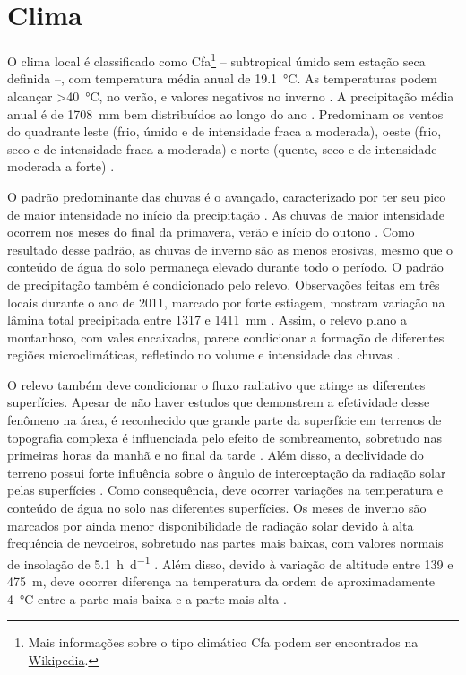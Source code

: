 \section{Clima}
\label{sec:chap02-clima}

\def\footcfa{\footnote{Mais informações sobre o tipo climático Cfa podem ser encontrados na 
\href{https://pt.wikipedia.org/wiki/Clima_subtropical_\%C3\%BAmido}{Wikipedia}.}}

O clima local é classificado como Cfa\footcfa{} -- subtropical úmido sem estação seca definida --, com 
temperatura média anual de \SI{19,1}{\celsius}. As temperaturas podem alcançar \SI{>40}{\celsius}, no verão, e 
valores negativos no inverno \cite{HeldweinEtAl2009}. A precipitação média anual é de \SI{1708}{\milli\metre} 
bem distribuídos ao longo do ano \cite{Maluf2000}. Predominam os ventos do quadrante leste (frio, úmido e de 
intensidade fraca a moderada), oeste (frio, seco e de intensidade fraca a moderada) e norte (quente, seco e de 
intensidade moderada a forte) \cite{HeldweinEtAl2009}.

O padrão predominante das chuvas é o avançado, caracterizado por ter seu pico de maior intensidade no início da 
precipitação \cite{MehlEtAl2001}. As chuvas de maior intensidade ocorrem nos meses do final da primavera, 
verão e início do outono \cite{MouraBueno2012}. Como resultado desse padrão, as chuvas de inverno são as 
menos erosivas, mesmo que o conteúdo de água do solo permaneça elevado durante todo o período. O padrão de 
precipitação também é condicionado pelo relevo. Observações feitas em três locais durante o ano de \num{2011}, 
marcado por forte estiagem, mostram variação na lâmina total precipitada entre \num{1317} e \SI{1411}{\mm} 
\cite{MouraBueno2012}. Assim, o relevo plano a montanhoso, com vales encaixados, parece condicionar a formação 
de diferentes regiões microclimáticas, refletindo no volume e intensidade das chuvas \cite{MouraBueno2012}.

O relevo também deve condicionar o fluxo radiativo que atinge as diferentes superfícies. Apesar de não haver 
estudos que demonstrem a efetividade desse fenômeno na área, é reconhecido que grande parte da superfície em 
terrenos de topografia complexa é influenciada pelo efeito de sombreamento, sobretudo nas primeiras horas da 
manhã e no final da tarde \cite{OliphantEtAl2003}. Além disso, a declividade do terreno possui forte influência 
sobre o ângulo de interceptação da radiação solar pelas superfícies \cite{Birkeland1999}. Como consequência, 
deve ocorrer variações na temperatura e conteúdo de água no solo nas diferentes superfícies. Os meses de 
inverno são marcados por ainda menor disponibilidade de radiação solar devido à alta frequência de nevoeiros, 
sobretudo nas partes mais baixas, com valores normais de insolação de \SI{5,1}{\hour\per\day} 
\cite{HeldweinEtAl2009}. Além disso, devido à variação de altitude entre \num{139} e \SI{475}{\metre}, deve 
ocorrer diferença na temperatura da ordem de aproximadamente \SI{4}{\celsius} entre a parte mais baixa e a 
parte mais alta \cite{HeldweinEtAl2009}.

